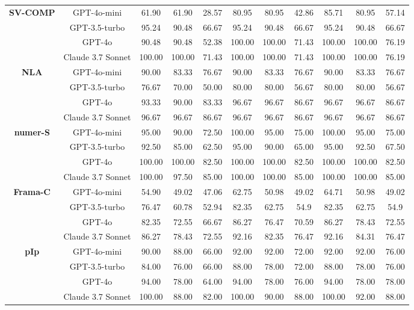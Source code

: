\begin{table}[t]
\begin{adjustbox}{max width=\textwidth}
\begin{tabular}{cc ccc ccc ccc}
\multirow{4}{*}{\textbf{SV-COMP}}
 & GPT-4o-mini & 61.90 & 61.90 & 28.57 & 80.95 & 80.95 & 42.86 & 85.71 & 80.95 & 57.14 \\
 & GPT-3.5-turbo & 95.24 & 90.48 & 66.67 & 95.24 & 90.48 & 66.67 & 95.24 & 90.48 & 66.67 \\
 & GPT-4o & 90.48 & 90.48 & 52.38 & 100.00 & 100.00 & 71.43 & 100.00 & 100.00 & 76.19 \\
 & Claude 3.7 Sonnet & 100.00 & 100.00 & 71.43 & 100.00 & 100.00 & 71.43 & 100.00 & 100.00 & 76.19 \\
\midrule

\multirow{4}{*}{\textbf{NLA}}
 & GPT-4o-mini & 90.00 & 83.33 & 76.67 & 90.00 & 83.33 & 76.67 & 90.00 & 83.33 & 76.67 \\
 & GPT-3.5-turbo & 76.67 & 70.00 & 50.00 & 80.00 & 80.00 & 56.67 & 80.00 & 80.00 & 56.67 \\
& GPT-4o & 93.33 & 90.00 & 83.33 & 96.67 & 96.67 & 86.67 & 96.67 & 96.67 & 86.67 \\
& Claude 3.7 Sonnet & 96.67 & 96.67 & 86.67 & 96.67 & 96.67 & 86.67 & 96.67 & 96.67 & 86.67 \\
\midrule

\multirow{4}{*}{\textbf{numer-S}}
 & GPT-4o-mini & 95.00 & 90.00 & 72.50 & 100.00 & 95.00 & 75.00 & 100.00 & 95.00 & 75.00 \\
 & GPT-3.5-turbo & 92.50 & 85.00 & 62.50 & 95.00 & 90.00 & 65.00 & 95.00 & 92.50 & 67.50 \\
 & GPT-4o & 100.00 & 100.00 & 82.50 & 100.00 & 100.00 & 82.50 & 100.00 & 100.00 & 82.50 \\
 & Claude 3.7 Sonnet & 100.00 & 97.50 & 85.00 & 100.00 & 100.00 & 85.00 & 100.00 & 100.00 & 85.00 \\
\midrule

\multirow{4}{*}{\textbf{Frama-C}}
 & GPT-4o-mini & 54.90 & 49.02 & 47.06 & 62.75 & 50.98 & 49.02 & 64.71 & 50.98 & 49.02 \\
 & GPT-3.5-turbo & 76.47 & 60.78 & 52.94 & 82.35 & 62.75 & 54.9 & 82.35 & 62.75 & 54.9 \\
 & GPT-4o & 82.35 & 72.55 & 66.67 & 86.27 & 76.47 & 70.59 & 86.27 & 78.43 & 72.55 \\
 & Claude 3.7 Sonnet & 86.27 & 78.43 & 72.55 & 92.16 & 82.35 & 76.47 & 92.16 & 84.31 & 76.47 \\
\midrule

\multirow{4}{*}{\textbf{pIp}}
 & GPT-4o-mini & 90.00 & 88.00 & 66.00 & 92.00 & 92.00 & 72.00 & 92.00 & 92.00 & 76.00 \\
 & GPT-3.5-turbo & 84.00 & 76.00 & 66.00 & 88.00 & 78.00 & 72.00 & 88.00 & 78.00 & 76.00 \\
 & GPT-4o & 94.00 & 78.00 & 64.00 & 94.00 & 78.00 & 76.00 & 94.00 & 78.00 & 78.00 \\
 & Claude 3.7 Sonnet & 100.00 & 88.00 & 82.00 & 100.00 & 90.00 & 88.00 & 100.00 & 92.00 & 88.00 \\
\midrule


\end{tabular}
\end{adjustbox}
\end{table}
